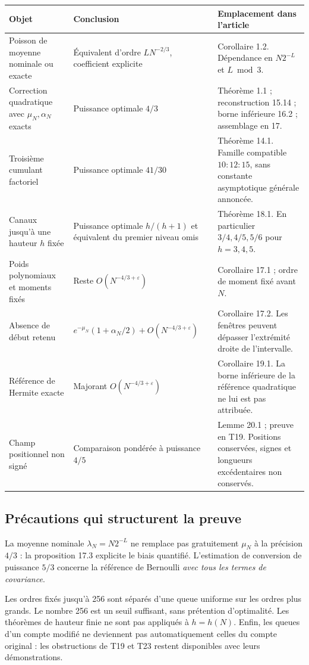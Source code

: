 \documentclass[11pt,a4paper]{article}
\newcommand{\eps}{\varepsilon}
\begin{document}
\small
\begin{tabularx}{\textwidth}{@{}>{\raggedright\arraybackslash}p{}>{\raggedright\arraybackslash}p{}>{\raggedright\arraybackslash}X@{}}
\toprule
Objet & Conclusion & Emplacement dans l'article\\
\midrule
Poisson de moyenne nominale ou exacte
& Équivalent d'ordre \(LN^{-2/3}\), coefficient explicite
& Corollaire 1.2. Dépendance en \(N2^{-L}\) et \(L\bmod 3\).\\[4pt]
Correction quadratique avec \(\mu_N,\alpha_N\) exacts
& Puissance optimale \(4/3\)
& Théorème 1.1 ; reconstruction 15.14 ; borne inférieure 16.2 ; assemblage en 17.\\[4pt]
Troisième cumulant factoriel
& Puissance optimale \(41/30\)
& Théorème 14.1. Famille compatible \(10:12:15\), sans constante asymptotique générale annoncée.\\[4pt]
Canaux jusqu'à une hauteur \(h\) fixée
& Puissance optimale \(h/(h+1)\) et équivalent du premier niveau omis
& Théorème 18.1. En particulier \(3/4,4/5,5/6\) pour \(h=3,4,5\).\\[4pt]
Poids polynomiaux et moments fixés
& Reste \(O(N^{-4/3+\eps})\)
& Corollaire 17.1 ; ordre de moment fixé avant \(N\).\\[4pt]
Absence de début retenu
& \(e^{-\mu_N}(1+\alpha_N/2)+O(N^{-4/3+\eps})\)
& Corollaire 17.2. Les fenêtres peuvent dépasser l'extrémité droite de l'intervalle.\\[4pt]
Référence de Hermite exacte
& Majorant \(O(N^{-4/3+\eps})\)
& Corollaire 19.1. La borne inférieure de la référence quadratique ne lui est pas attribuée.\\[4pt]
Champ positionnel non signé
& Comparaison pondérée à puissance \(4/5\)
& Lemme 20.1 ; preuve en T19. Positions conservées, signes et longueurs excédentaires non conservés.\\
\bottomrule
\end{tabularx}
\normalsize

\subsection*{Précautions qui structurent la preuve}
La moyenne nominale \(\lambda_N=N2^{-L}\) ne remplace pas gratuitement
\(\mu_N\) à la précision \(4/3\) : la proposition 17.3 explicite le
biais quantifié. L'estimation de conversion de puissance \(5/3\)
concerne la référence de Bernoulli \emph{avec tous les termes de covariance}.

Les ordres fixés jusqu'à 256 sont séparés d'une queue uniforme sur les
ordres plus grands. Le nombre 256 est un seuil suffisant, sans prétention
d'optimalité. Les théorèmes de hauteur finie ne sont pas appliqués à
\(h=h(N)\). Enfin, les queues d'un compte modifié ne deviennent pas
automatiquement celles du compte original : les obstructions de T19 et
T23 restent disponibles avec leurs démonstrations.
\end{document}

